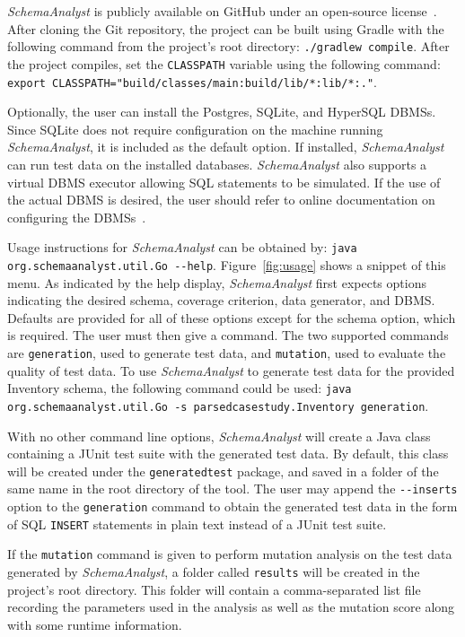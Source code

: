 \textit{SchemaAnalyst} is publicly available on GitHub under an open-source license~\cite{tool}. After
cloning the Git repository, the project can be built using Gradle with the following command from the
project's root directory: \lstinline{./gradlew compile}. After the project compiles, set the
\lstinline{CLASSPATH} variable using the following command: 
\lstinline{export CLASSPATH="build/classes/main:build/lib/*:lib/*:."}.

Optionally, the user can install the Postgres, SQLite, and HyperSQL DBMSs. Since SQLite
does not require configuration on the machine running \textit{SchemaAnalyst}, it is included as the default
option. If installed, \textit{SchemaAnalyst} can run test data on the installed databases. \textit{SchemaAnalyst}
also supports a virtual DBMS executor
allowing SQL statements to be simulated. If the use of the actual DBMS is desired, the user should refer to
online documentation on configuring the DBMSs~\cite{tool}.

Usage instructions for \textit{SchemaAnalyst} can be obtained by: 
\lstinline{java org.schemaanalyst.util.Go --help}. Figure~\ref{fig:usage} shows a snippet of this menu.
As indicated by the help display, \textit{SchemaAnalyst} first expects options indicating the desired
schema, coverage criterion, data generator, and DBMS. Defaults are provided for all of these options
except for the schema option, which is required. The user must then give a command.  The two supported
commands are \lstinline{generation}, used to generate test data, and \lstinline{mutation}, used to
evaluate the quality of test data.
To use \textit{SchemaAnalyst} to generate test data for the provided Inventory schema, the following
command could be used: 
\lstinline{java org.schemaanalyst.util.Go -s parsedcasestudy.Inventory generation}.



With no other command line options, \textit{SchemaAnalyst} will create a Java class containing a JUnit test
suite with the generated test data. By default, this class will be created under the \texttt{generatedtest}
package, and saved in a folder of the same name in the root directory of the tool.
The user may append the \lstinline{--inserts} option to the \lstinline{generation} command to obtain the
generated test data in the form of SQL \texttt{INSERT} statements in plain text instead of a JUnit test suite.

If the \lstinline{mutation} command is given to perform mutation analysis on the test data generated by
\textit{SchemaAnalyst}, a folder called \lstinline{results} will be created in the project's root directory.
This folder will contain a comma-separated list file recording the parameters used in the analysis as well
as the mutation score along with some runtime information.

